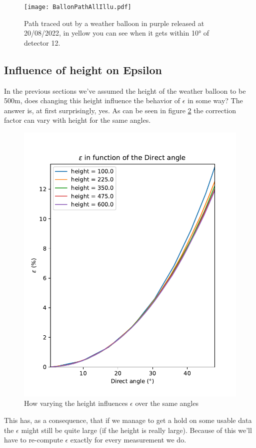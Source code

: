 \begin{figure}
  \centering
	\texttt{[image: BallonPathAllIllu.pdf]}
  \caption{Path traced out by a weather balloon in purple released at 20/08/2022, in yellow you can see when it
  gets within 10° of detector 12.}
  \label{fig:ExampleBalloonPathCrossing12}
\end{figure}


\subsection{Influence of height on Epsilon}
In the previous sections we've assumed the height of the weather balloon to be
500m, does changing this height influence the behavior of $\epsilon$ in some
way?  The answer is, at first surprisingly, yes. As can be seen in figure
\ref{fig:EpsWithHeight} the correction factor can vary with height for the same angles.
\begin{figure}
	\centering
	\includegraphics[height=0.4\textheight]{figures/EpsilonWithHeight.pdf}
	\caption{How varying the height influences $\epsilon$ over the same angles}
	\label{fig:EpsWithHeight}
\end{figure}
This has, as a consequence, that if we manage to get a hold on some
usable data the $\epsilon$
might still be quite large (if the height is really large).
Because of this we'll have to re-compute $\epsilon$ exactly for 
every measurement we do.
